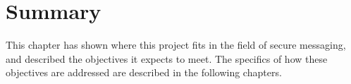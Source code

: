 \documentclass[a4paper, twoside, 12pt]{report}
\begin{document}
%
%
%        
%        
%        

\section{Summary}
This chapter has shown where this project fits in the field of secure messaging, and described the objectives it expects to meet. The specifics of how these objectives are addressed are described in the following chapters.
\end{document}
